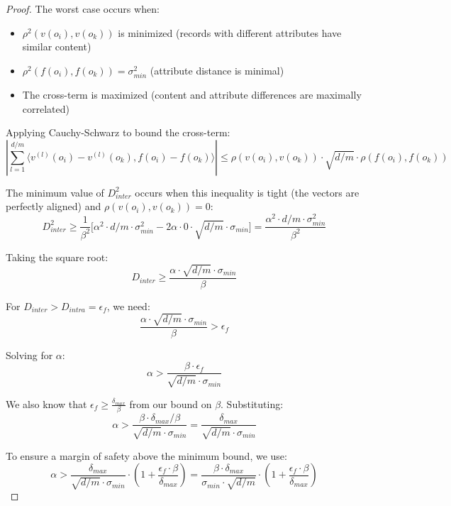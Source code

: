 \documentclass[numbers,sort]{article}
\begin{document}
\begin{proof}
The worst case occurs when:
\begin{itemize}
\item $\rho^2(v(o_i), v(o_k))$ is minimized (records with different attributes have similar content)
\item $\rho^2(f(o_i), f(o_k)) = \sigma_{min}^2$ (attribute distance is minimal)
\item The cross-term is maximized (content and attribute differences are maximally correlated)
\end{itemize}

Applying Cauchy-Schwarz to bound the cross-term:
\begin{equation}
\left|\sum_{l=1}^{d/m} \langle v^{(l)}(o_i) - v^{(l)}(o_k), f(o_i) - f(o_k) \rangle\right| \leq \rho(v(o_i), v(o_k)) \cdot \sqrt{d/m} \cdot \rho(f(o_i), f(o_k))
\end{equation}

The minimum value of $D_{inter}^2$ occurs when this inequality is tight (the vectors are perfectly aligned) and $\rho(v(o_i), v(o_k)) = 0$:
\begin{equation}
D_{inter}^2 \geq \frac{1}{\beta^2}\Big[\alpha^2 \cdot d/m \cdot \sigma_{min}^2 - 2\alpha \cdot 0 \cdot \sqrt{d/m} \cdot \sigma_{min}\Big] = \frac{\alpha^2 \cdot d/m \cdot \sigma_{min}^2}{\beta^2}
\end{equation}

Taking the square root:
\begin{equation}
D_{inter} \geq \frac{\alpha \cdot \sqrt{d/m} \cdot \sigma_{min}}{\beta}
\end{equation}

For $D_{inter} > D_{intra} = \epsilon_f$, we need:
\begin{equation}
\frac{\alpha \cdot \sqrt{d/m} \cdot \sigma_{min}}{\beta} > \epsilon_f
\end{equation}

Solving for $\alpha$:
\begin{equation}
\alpha > \frac{\beta \cdot \epsilon_f}{\sqrt{d/m} \cdot \sigma_{min}}
\end{equation}

We also know that $\epsilon_f \geq \frac{\delta_{max}}{\beta}$ from our bound on $\beta$. Substituting:
\begin{equation}
\alpha > \frac{\beta \cdot \delta_{max}/\beta}{\sqrt{d/m} \cdot \sigma_{min}} = \frac{\delta_{max}}{\sqrt{d/m} \cdot \sigma_{min}}
\end{equation}

To ensure a margin of safety above the minimum bound, we use:
\begin{equation}
\alpha > \frac{\delta_{max}}{\sqrt{d/m} \cdot \sigma_{min}} \cdot \left(1 + \frac{\epsilon_f \cdot \beta}{\delta_{max}}\right) = \frac{\beta \cdot \delta_{max}}{\sigma_{min} \cdot \sqrt{d/m}} \cdot \left(1 + \frac{\epsilon_f \cdot \beta}{\delta_{max}}\right)
\end{equation}


\end{proof}
\end{document}
